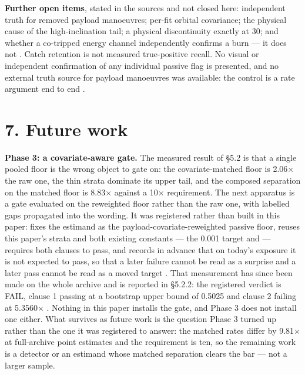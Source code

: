 \documentclass[11pt]{article}
\begin{document}
\textbf{Further open items}, stated in the sources and not closed here: independent truth for removed payload manoeuvres; per-fit orbital covariance; the physical cause of the high-inclination tail; a physical discontinuity exactly at 30\textdegree{}; and whether a co-tripped energy channel independently confirms a burn --- it does not%
. Catch retention is not measured true-positive recall. No visual or independent confirmation of any individual passive flag is presented, and no external truth source for payload manoeuvres was available: the control is a rate argument end to end%
.

\section*{7. Future work}

\textbf{Phase 3: a covariate-aware gate.} The measured result of \S{}5.2 is that a single pooled floor is the wrong object to gate on: the covariate-matched floor is 2.06$\times$ the raw one, the thin strata dominate its upper tail, and the composed separation on the matched floor is 8.83$\times$ against a 10$\times$ requirement. The next apparatus is a gate evaluated on the reweighted floor rather than the raw one, with labelled gaps propagated into the wording. It was registered rather than built in this paper:  fixes the estimand as the payload-covariate-reweighted passive floor, reuses this paper's strata and both existing constants --- the 0.001 target and  --- requires both clauses to pass, and records in advance that on today's exposure it is not expected to pass, so that a later failure cannot be read as a surprise and a later pass cannot be read as a moved target%
. That measurement has since been made on the whole archive and is reported in \S{}5.2.2: the registered verdict is FAIL, clause 1 passing at a bootstrap upper bound of 0.5025 and clause 2 failing at 5.3560$\times$%
. Nothing in this paper installs the gate, and Phase 3 does not install one either. What survives as future work is the question Phase 3 turned up rather than the one it was registered to answer: the matched rates differ by 9.81$\times$ at full-archive point estimates and the requirement is ten, so the remaining work is a detector or an estimand whose matched separation clears the bar --- not a larger sample.
\end{document}
